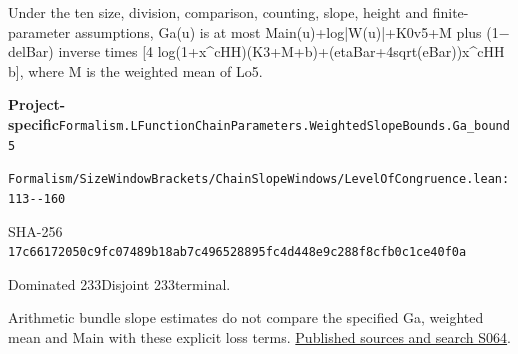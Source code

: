 
\begin{formalstatement}[D568]\label{decomp:D568}
Under the ten size, division, comparison, counting, slope, height and finite-parameter assumptions, Ga(u) is at most Main(u)+log|W(u)|+K0v5+M plus (1\ensuremath{-}delBar) inverse times [4 log(1+x\textasciicircum{}cHH)(K3+M+b)+(etaBar+4sqrt(eBar))x\textasciicircum{}cHH b], where M is the weighted mean of Lo5.
\end{formalstatement}
{\small\raggedright\noindent\textsf{\bfseries Project-specific}\quad \nolinkurl{Formalism.LFunctionChainParameters.WeightedSlopeBounds.Ga_bound5}\par\noindent \nolinkurl{Formalism/SizeWindowBrackets/ChainSlopeWindows/LevelOfCongruence.lean:113--160}\par\noindent SHA-256 \nolinkurl{17c66172050c9fc07489b18ab7c496528895fc4d448e9c288f8cfb0c1ce40f0a}\par\noindent Dominated 233\quad Disjoint 233\quad terminal.\par}
Arithmetic bundle slope estimates do not compare the specified Ga, weighted mean and Main with these explicit loss terms.
\hyperref[lit:S064]{Published sources and search S064}.
